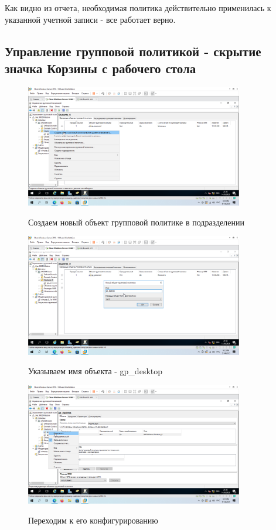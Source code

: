 \documentclass[a4paper]{article}
\begin{document}
  Как видно из отчета, необходимая политика действительно применилась к указанной учетной записи - все работает верно.

  \subsection{Управление групповой политикой - скрытие значка Корзины с рабочего стола}

  \begin{figure}[H]
    \centering
    \includegraphics[width=0.85\textwidth]{5_0136}
    \label{img:136}
    \caption{Создаем новый объект групповой политике в подразделении}
  \end{figure}

  \begin{figure}[H]
    \centering
    \includegraphics[width=0.85\textwidth]{5_0137}
    \label{img:137}
    \caption{Указываем имя объекта - gp\_desktop}
  \end{figure}

  \begin{figure}[H]
    \centering
    \includegraphics[width=0.85\textwidth]{5_0138}
    \label{img:138}
    \caption{Переходим к его конфигурированию}
  \end{figure}
\end{document}
